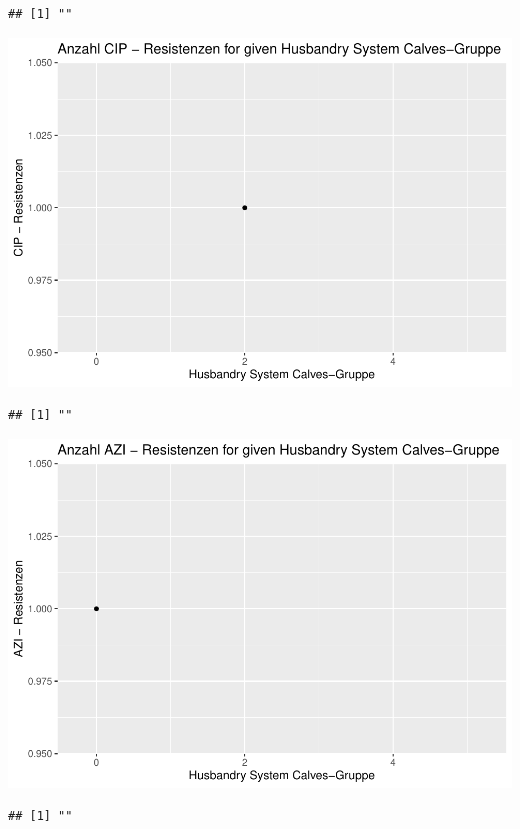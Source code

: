 \documentclass[
]{article}
\begin{document}
\begin{verbatim}
## [1] ""
\end{verbatim}

\includegraphics{NResistenzen_files/figure-latex/binary_or_nominal_variables-32.pdf}

\begin{verbatim}
## [1] ""
\end{verbatim}

\includegraphics{NResistenzen_files/figure-latex/binary_or_nominal_variables-33.pdf}

\begin{verbatim}
## [1] ""
\end{verbatim}
\end{document}
